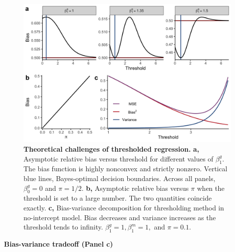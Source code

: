 \documentclass[12pt]{article}
\begin{document}
\begin{figure}[h!]
	\centering
	\includegraphics[width=1\linewidth]{../../figures/thresholding_theoretical/plot}
	\caption{\textbf{Theoretical challenges of thresholded regression.} \textbf{a,} Asymptotic relative bias versus threshold for different values of $\beta^g_1$. The bias function is highly nonconvex and strictly nonzero. Vertical blue lines, Bayes-optimal decision boundaries. Across all panels, $\beta^g_0 = 0$ and $\pi = 1/2$. \textbf{b,} Asymptotic relative bias versus $\pi$ when the threshold is set to a large number. The two quantities coincide exactly. \textbf{c,} Bias-variance decomposition for thresholding method in no-intercept model. Bias decreases and variance increases as the threshold tends to infinity. $\beta^g_1 = 1, \beta^m_1 = 1,$ and $\pi = 0.1$.}
	\label{thresholding_theoretical}
\end{figure}

\begin{center}
	\textbf{Bias-variance tradeoff (Panel c)}
\end{center}
\end{document}
